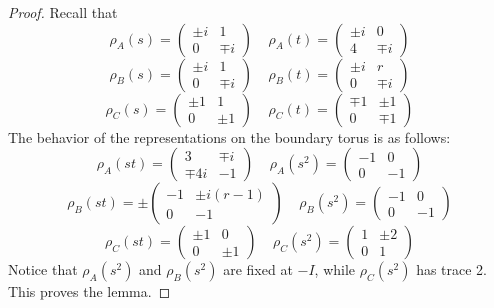 \documentclass{article}
\theoremstyle{plain}
\theoremstyle{definition}
\theoremstyle{plain}
\theoremstyle{plain}
\theoremstyle{plain}
\theoremstyle{remark}
\theoremstyle{remark}
\theoremstyle{plain}
\theoremstyle{plain}
\begin{document}
\begin{proof}
Recall that 
\begin{equation}
	\rho_A(s) = \begin{pmatrix}\pm i&1\\0&\mp i\end{pmatrix} \ \ \ \ \ \rho_A(t) = \begin{pmatrix}\pm i&0\\4&\mp i\end{pmatrix}
\end{equation}
\begin{equation}
	\rho_B(s) = \begin{pmatrix}\pm i&1\\0&\mp i\end{pmatrix} \ \ \ \ \ \rho_B(t) = \begin{pmatrix}\pm i&r\\0&\mp i\end{pmatrix}
\end{equation}
\begin{equation}
	\rho_C(s) = \begin{pmatrix}\pm1&1\\0&\pm1\end{pmatrix} \ \ \ \ \ \rho_C(t) = \begin{pmatrix}\mp1&\pm1\\0&\mp 1\end{pmatrix}
\end{equation}
The behavior of the representations on the boundary torus is as follows:
\begin{equation}
	\rho_A(st) = \begin{pmatrix}3&\mp i\\\mp 4i&-1\end{pmatrix} \ \ \ \ \ \rho_A(s^2) = \begin{pmatrix}-1&0\\0&-1\end{pmatrix}
\end{equation}
\begin{equation}
	\rho_B(st) = \pm\begin{pmatrix}-1&\pm i(r-1)\\0&-1\end{pmatrix} \ \ \ \ \ \rho_B(s^2) = \begin{pmatrix}-1&0\\0&-1\end{pmatrix}
\end{equation}
\begin{equation}
	\rho_C(st) = \begin{pmatrix}\pm1&0\\0&\pm1\end{pmatrix} \ \ \ \ \ \rho_C(s^2) = \begin{pmatrix}1&\pm 2\\0&1\end{pmatrix}
\end{equation}
Notice that $\rho_A(s^2)$ and $\rho_B(s^2)$ are fixed at $-I$, while $\rho_C(s^2)$ has trace 2. This proves the lemma. 
\end{proof}
\end{document}
